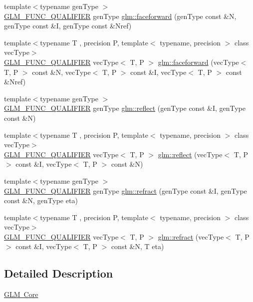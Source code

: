 \begin{DoxyCompactItemize}
{\footnotesize template$<$typename gen\+Type $>$ }\\\mbox{\hyperlink{setup_8hpp_a33fdea6f91c5f834105f7415e2a64407}{G\+L\+M\+\_\+\+F\+U\+N\+C\+\_\+\+Q\+U\+A\+L\+I\+F\+I\+ER}} gen\+Type \mbox{\hyperlink{namespaceglm_ad32c7f0f9f0ca45467adbb4a1db5184d}{glm\+::faceforward}} (gen\+Type const \&N, gen\+Type const \&I, gen\+Type const \&Nref)
\item 
{\footnotesize template$<$typename T , precision P, template$<$ typename, precision $>$ class vec\+Type$>$ }\\\mbox{\hyperlink{setup_8hpp_a33fdea6f91c5f834105f7415e2a64407}{G\+L\+M\+\_\+\+F\+U\+N\+C\+\_\+\+Q\+U\+A\+L\+I\+F\+I\+ER}} vec\+Type$<$ T, P $>$ \mbox{\hyperlink{group__core__func__geometric_gaea854e5aec1b5839832ac2dfc7cd3c0d}{glm\+::faceforward}} (vec\+Type$<$ T, P $>$ const \&N, vec\+Type$<$ T, P $>$ const \&I, vec\+Type$<$ T, P $>$ const \&Nref)
\item 
{\footnotesize template$<$typename gen\+Type $>$ }\\\mbox{\hyperlink{setup_8hpp_a33fdea6f91c5f834105f7415e2a64407}{G\+L\+M\+\_\+\+F\+U\+N\+C\+\_\+\+Q\+U\+A\+L\+I\+F\+I\+ER}} gen\+Type \mbox{\hyperlink{group__core__func__geometric_gab63646fc36b81cf69d3ce123a72f76f2}{glm\+::reflect}} (gen\+Type const \&I, gen\+Type const \&N)
\item 
{\footnotesize template$<$typename T , precision P, template$<$ typename, precision $>$ class vec\+Type$>$ }\\\mbox{\hyperlink{setup_8hpp_a33fdea6f91c5f834105f7415e2a64407}{G\+L\+M\+\_\+\+F\+U\+N\+C\+\_\+\+Q\+U\+A\+L\+I\+F\+I\+ER}} vec\+Type$<$ T, P $>$ \mbox{\hyperlink{namespaceglm_a7529009ea7fb6322ce0472f7d6a480e7}{glm\+::reflect}} (vec\+Type$<$ T, P $>$ const \&I, vec\+Type$<$ T, P $>$ const \&N)
\item 
{\footnotesize template$<$typename gen\+Type $>$ }\\\mbox{\hyperlink{setup_8hpp_a33fdea6f91c5f834105f7415e2a64407}{G\+L\+M\+\_\+\+F\+U\+N\+C\+\_\+\+Q\+U\+A\+L\+I\+F\+I\+ER}} gen\+Type \mbox{\hyperlink{namespaceglm_ae4b0245b42a72957d3026ac365731821}{glm\+::refract}} (gen\+Type const \&I, gen\+Type const \&N, gen\+Type eta)
\item 
{\footnotesize template$<$typename T , precision P, template$<$ typename, precision $>$ class vec\+Type$>$ }\\\mbox{\hyperlink{setup_8hpp_a33fdea6f91c5f834105f7415e2a64407}{G\+L\+M\+\_\+\+F\+U\+N\+C\+\_\+\+Q\+U\+A\+L\+I\+F\+I\+ER}} vec\+Type$<$ T, P $>$ \mbox{\hyperlink{group__core__func__geometric_gab7e7cdf4403931a5f7b74560ad64159b}{glm\+::refract}} (vec\+Type$<$ T, P $>$ const \&I, vec\+Type$<$ T, P $>$ const \&N, T eta)
\end{DoxyCompactItemize}


\subsection{Detailed Description}
\mbox{\hyperlink{group__core}{G\+LM Core}} 